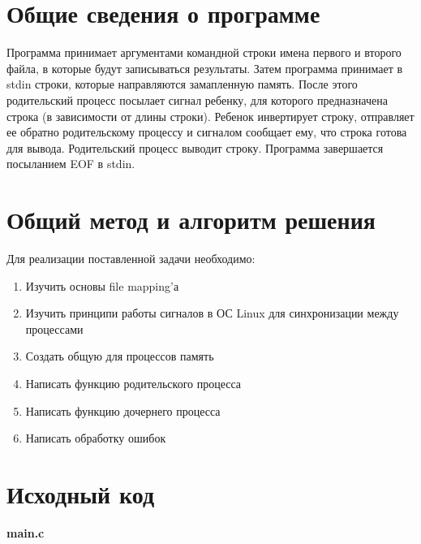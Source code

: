 \section{Общие сведения о программе}

Программа принимает аргументами командной строки имена первого и второго файла, в которые будут записываться результаты. Затем программа принимает в stdin строки, которые направляются замапленную память. После этого родительский процесс посылает сигнал ребенку, для которого предназначена строка (в зависимости от длины строки). Ребенок инвертирует строку, отправляет ее обратно родительскому процессу и сигналом сообщает ему, что строка готова для вывода. Родительский процесс выводит строку. Программа завершается посыланием EOF в stdin.

\pagebreak

\section{Общий метод и алгоритм решения}

Для реализации поставленной задачи необходимо:

\begin{enumerate}
    \item Изучить основы file mapping'а
    \item Изучить принципи работы сигналов в ОС Linux для синхронизации между процессами
    \item Создать общую для процессов память
    \item Написать функцию родительского процесса
    \item Написать функцию дочернего процесса
    \item Написать обработку ошибок
\end{enumerate}

\pagebreak

\section{Исходный код}

\textbf{main.c}


